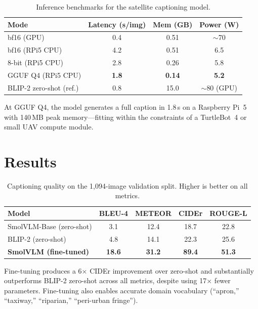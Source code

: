 \documentclass[conference]{IEEEtran}
\begin{document}
\begin{table}[h]
\centering
\caption{Inference benchmarks for the satellite captioning model.}
\label{tab:deploy}
\begin{tabular}{lccc}
\toprule
Mode & Latency (s/img) & Mem (GB) & Power (W) \\
\midrule
bf16 (GPU)           & 0.4 & 0.51 & $\sim$70 \\
bf16 (RPi5 CPU)      & 4.2 & 0.51 & 6.5 \\
8-bit (RPi5 CPU)     & 2.8 & 0.26 & 5.8 \\
GGUF Q4 (RPi5 CPU)   & \textbf{1.8} & \textbf{0.14} & \textbf{5.2} \\
\midrule
BLIP-2 zero-shot (ref.) & 0.8 & 15.0 & $\sim$80 (GPU) \\
\bottomrule
\end{tabular}
\end{table}

At GGUF Q4, the model generates a full caption in 1.8\,s on a Raspberry Pi~5 with 140\,MB peak
memory---fitting within the constraints of a TurtleBot~4 or small UAV compute module.

\section{Results}
\label{sec:results}

\begin{table}[h]
\centering
\caption{Captioning quality on the 1,094-image validation split. Higher is better on all metrics.}
\label{tab:metrics}
\begin{tabular}{lcccc}
\toprule
Model & BLEU-4 & METEOR & CIDEr & ROUGE-L \\
\midrule
SmolVLM-Base (zero-shot) & 3.1  & 12.4 & 18.7  & 22.8 \\
BLIP-2 (zero-shot)       & 4.8  & 14.1 & 22.3  & 25.6 \\
\textbf{SmolVLM (fine-tuned)} & \textbf{18.6} & \textbf{31.2} & \textbf{89.4} & \textbf{51.3} \\
\bottomrule
\end{tabular}
\end{table}

Fine-tuning produces a 6$\times$ CIDEr improvement over zero-shot and substantially outperforms
BLIP-2 zero-shot across all metrics, despite using 17$\times$ fewer parameters. Fine-tuning also
enables accurate domain vocabulary (``apron,'' ``taxiway,'' ``riparian,'' ``peri-urban fringe'').
\end{document}
